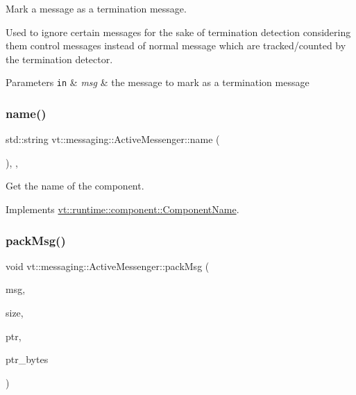 Mark a message as a termination message. 

Used to ignore certain messages for the sake of termination detection considering them control messages instead of normal message which are tracked/counted by the termination detector.


\begin{DoxyParams}[1]{Parameters}
\mbox{\tt in}  & {\em msg} & the message to mark as a termination message \\
\hline
\end{DoxyParams}
\mbox{\label{structvt_1_1messaging_1_1_active_messenger_a42112dea411907ca529bd5bc6586249a}} 
\subsubsection{\texorpdfstring{name()}{name()}}
{\footnotesize\ttfamily std\+::string vt\+::messaging\+::\+Active\+Messenger\+::name (\begin{DoxyParamCaption}{ }\end{DoxyParamCaption})\hspace{0.3cm}{\ttfamily [inline]}, {\ttfamily [override]}, {\ttfamily [virtual]}}



Get the name of the component. 



Implements \hyperlink{structvt_1_1runtime_1_1component_1_1_component_name_a33c06229bb605a2b2ceff68830d6d773}{vt\+::runtime\+::component\+::\+Component\+Name}.

\mbox{\label{structvt_1_1messaging_1_1_active_messenger_a9799bd2681540170faa04b424d3c849e}} 
\subsubsection{\texorpdfstring{pack\+Msg()}{packMsg()}}
{\footnotesize\ttfamily void vt\+::messaging\+::\+Active\+Messenger\+::pack\+Msg (\begin{DoxyParamCaption}\item[{\hyperlink{structvt_1_1messaging_1_1_active_messenger_a720a2b1e7462d414b2a51d9fe005eca9}{Message\+Type} $\ast$}]{msg,  }\item[{\hyperlink{namespacevt_a408e86a8c7c89309b52907dc5a513924}{Msg\+Size\+Type}}]{size,  }\item[{void $\ast$}]{ptr,  }\item[{\hyperlink{namespacevt_a408e86a8c7c89309b52907dc5a513924}{Msg\+Size\+Type}}]{ptr\+\_\+bytes }\end{DoxyParamCaption})}



